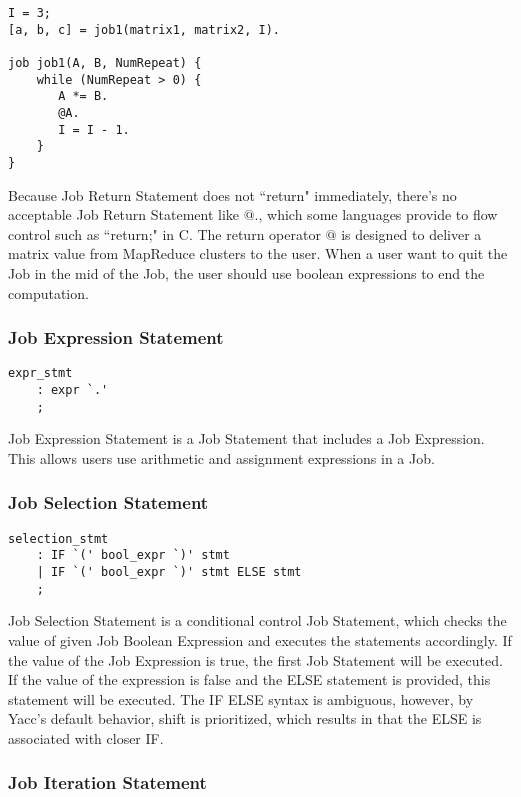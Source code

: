 \documentclass[prodmode,acmtecs]{acmsmall}
\begin{document}
\begin{lstlisting}
I = 3;
[a, b, c] = job1(matrix1, matrix2, I).

job job1(A, B, NumRepeat) {
    while (NumRepeat > 0) {
       A *= B.
       @A.
       I = I - 1. 
    }
}
\end{lstlisting}

Because Job Return Statement does not ``return" immediately,
there's no acceptable Job Return Statement like $@.$, which some
languages provide to flow control such as ``return;" in C.  The
return operator $@$ is designed to deliver a matrix value from
MapReduce clusters to the user.  When a user want to quit the Job
in the mid of the Job, the user should use boolean expressions to
end the computation.
\medskip


\subsubsection{Job Expression Statement}

\begin{lstlisting}
expr_stmt
	: expr `.'
	;
\end{lstlisting}

Job Expression Statement is a Job Statement that includes a Job
Expression.  This allows users use arithmetic and assignment expressions in a Job. 

\medskip

\subsubsection{Job Selection Statement}

\begin{lstlisting}
selection_stmt
	: IF `(' bool_expr `)' stmt
	| IF `(' bool_expr `)' stmt ELSE stmt
	;
\end{lstlisting}

Job Selection Statement is a conditional control Job Statement,
which checks the value of given Job Boolean Expression and executes
the statements accordingly.  If the value of the Job Expression is
true, the first Job Statement will be executed.  If the value of
the expression is false and the ELSE statement is provided, this
statement will be executed.  The IF ELSE syntax is ambiguous,
however, by Yacc's default behavior, shift is prioritized, which
results in that the ELSE is associated with closer IF.
\medskip

\subsubsection{Job Iteration Statement}
\end{document}
